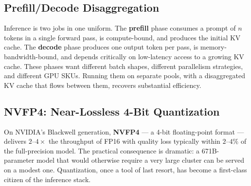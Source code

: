 \documentclass[11pt,a4paper]{article}
\theoremstyle{definition}
\theoremstyle{plain}
\begin{document}
\subsection{Prefill/Decode Disaggregation}

Inference is two jobs in one uniform. The \textbf{prefill} phase consumes a prompt of $n$ tokens in a single forward pass, is compute-bound, and produces the initial KV cache. The \textbf{decode} phase produces one output token per pass, is memory-bandwidth-bound, and depends critically on low-latency access to a growing KV cache. These phases want different batch shapes, different parallelism strategies, and different GPU SKUs. Running them on separate pools, with a disaggregated KV cache that flows between them, recovers substantial efficiency.

\begin{center}
\end{center}

\subsection{NVFP4: Near-Lossless 4-Bit Quantization}

On NVIDIA's Blackwell generation, \textbf{NVFP4} --- a 4-bit floating-point format --- delivers $2\text{--}4\times$ the throughput of FP16 with quality loss typically within $2\text{--}4\%$ of the full-precision model. The practical consequence is dramatic: a 671B-parameter model that would otherwise require a very large cluster can be served on a modest one. Quantization, once a tool of last resort, has become a first-class citizen of the inference stack.
\end{document}
